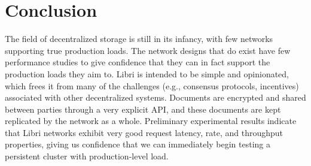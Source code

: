 \documentclass[10pt]{article}
\begin{document}
\section{Conclusion}
The field of decentralized storage is still in its infancy, with few networks supporting true production loads. The network designs that do exist have few performance studies to give confidence that they can in fact support the production loads they aim to. Libri is intended to be simple and opinionated, which frees it from many of the challenges (e.g., consensus protocols, incentives) associated with other decentralized systems. Documents are encrypted and shared between parties through a very explicit API, and these documents are kept replicated by the network as a whole. Preliminary experimental results indicate that Libri networks exhibit very good request latency, rate, and throughput properties, giving us confidence that we can immediately begin testing a persistent cluster with production-level load. 
\end{document}

